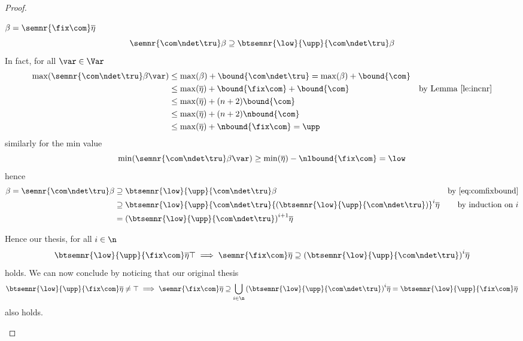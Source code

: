 \begin{proof}
\begin{inductive}
\begin{description}
      \(\beta = \semnr{\fix\com}\overline\eta\)
      \begin{equation}\label{eq:comfixbound}
       \semnr{\com\ndet\tru}\beta \supseteq \btsemnr{\low}{\upp}{\com\ndet\tru}\beta
      \end{equation}
      In fact, for all \(\var\in \Var\)
      \begin{align*}
        \max(\semnr{\com\ndet\tru}\beta\var) & \leq \max(\beta) + \bound{\com\ndet\tru} = \max(\beta) + \bound{\com} \\
                                             & \leq \max(\overline\eta) + \bound{\fix\com} + \bound{\com} & \text{by Lemma~\ref{le:incnr}} \\
                                             & \leq \max(\overline\eta) + (n+2)\bound{\com} \\
                                             & \leq \max(\overline\eta) + (n+2)\nbound{\com} \\
                                             & \leq \max(\overline\eta) + \nbound{\fix\com} = \upp
      \end{align*}
      similarly for the min value
      \begin{equation*}
        \min(\semnr{\com\ndet\tru}\beta\var) \geq \min(\overline\eta) - \nlbound{\fix\com} = \low
      \end{equation*}
      hence
      \begin{align*}
        \beta = \semnr{\com\ndet\tru}\beta & \supseteq \btsemnr{\low}{\upp}{\com\ndet\tru}\beta & \text{by~\eqref{eq:comfixbound}}\\
                                           & \supseteq \btsemnr{\low}{\upp}{\com\ndet\tru}{\left(\btsemnr{\low}{\upp}{\com\ndet\tru}\right)}^i\overline\eta & \text{by induction on } i\\
                                           & = {\left(\btsemnr{\low}{\upp}{\com\ndet\tru}\right)}^{i+1}\overline\eta
      \end{align*}
    \end{description}
    Hence our thesis, for all \(i \in \n\)
    \begin{equation*}
      \btsemnr{\low}{\upp}{\fix\com}\overline\eta \top \implies
      \semnr{\fix\com}\overline\eta \supseteq
      {\left(\btsemnr{\low}{\upp}{\com\ndet\tru}\right)}^i\overline\eta
    \end{equation*}
    holds.  We can now conclude by noticing that our original thesis
    \begin{equation*}
      \btsemnr{\low}{\upp}{\fix\com}\overline\eta \neq \top \implies
      \semnr{\fix\com}\overline\eta \supseteq
      \bigcup_{i\in\n}{\left(\btsemnr{\low}{\upp}{\com\ndet\tru}\right)}^i\overline\eta =
      \btsemnr{\low}{\upp}{\fix\com}\overline\eta
    \end{equation*}
    also holds.
  \end{inductive}
\end{proof}

